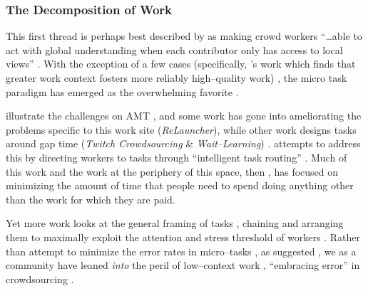\documentclass[trackingWork]{subfiles}
\begin{document}
\subsubsection[the decomposition of work]{The Decomposition of Work}\label{sec:decomposition}

\subsubsubsection{\crowdworkpers}
This first thread is
perhaps best described by \citeauthor{verroios2014context} as
making crowd workers ``\dots able to act with
global understanding when each contributor only has access to local views''
\cite{verroios2014context}.
With the exception of a few cases
(specifically, \citeauthor{Kinnaird:2012:WTM:2389176.2389219}'s work
which finds that greater work context fosters more reliably high--quality work)%
, the micro task paradigm has emerged as the overwhelming favorite
\cite{selfsourcingTeevan2014,selfsourcingTeevan2016%
,       cheng2015break,Kinnaird:2012:WTM:2389176.2389219}.


\citeauthor{taskSearch} illustrate the challenges on AMT%
, and some work has gone into ameliorating the problems specific to this work site
(\textit{ReLauncher}), %
while other work designs tasks around gap time
(\textit{Twitch Crowdsourcing} \& \textit{Wait--Learning})
\cite{taskSearch,KucherbaevReLauncher,Vaish:2014:TCC:2611222.2556996%
,       Cai:2015:WLW:2702123.2702267}.
\citeauthor{Cosley:2007:SUI:1216295.1216309}
attempts to address this by
directing workers to tasks through
``intelligent task routing''
\cite{Cosley:2007:SUI:1216295.1216309}.
Much of this work and the work at the periphery of this space, then%
, has focused on
minimizing the amount of time that people need to spend doing
anything other than the work for which they are paid.

Yet more work looks at the general framing of tasks%
, chaining and arranging them to maximally exploit
the attention and stress threshold %
of workers
\cite{Cai:2016:CRI:2858036.2858237}.
Rather than attempt to minimize the error rates in micro--tasks%
, as \citeauthor{Kinnaird:2012:WTM:2389176.2389219} suggested%
, we as a community have leaned \textit{into} the peril of
low--context work%
, ``embracing error'' in crowdsourcing
\cite{embracingErrorKrishna}.
\end{document}
